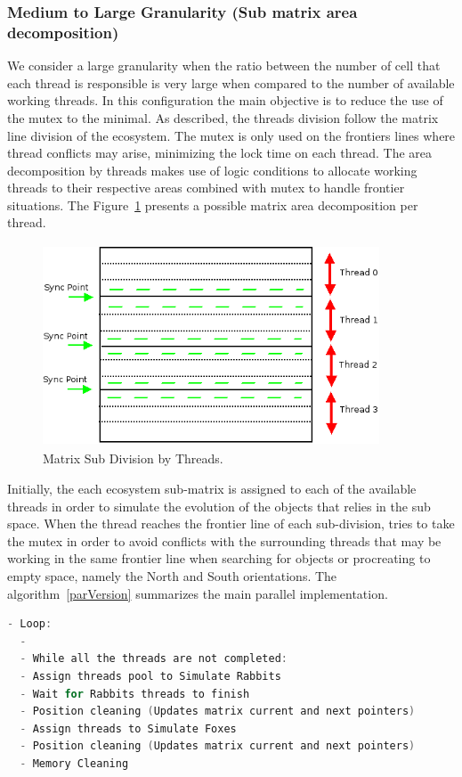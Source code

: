 \documentclass[10pt,a4paper,final]{report}
\begin{document}
\subsubsection{Medium to Large Granularity (Sub matrix area decomposition)}
We consider a large granularity when the ratio between the number of cell that each thread is responsible is very large when compared to the number of available working threads.
In this configuration the main objective is to reduce the use of the mutex to the minimal. As described, the threads division follow the matrix line division of the ecosystem. The mutex is only used on the frontiers lines where thread conflicts may arise, minimizing the lock time on each thread. The area decomposition by threads makes use of logic conditions to allocate working threads to their respective areas combined with mutex to handle frontier situations. The Figure~\ref{fig_submatrix} presents a possible matrix area decomposition per thread. 

\begin{figure}[H]
      \centering
      \includegraphics[height=6cm,width=10cm]{matrixDiv.png}
	        
      \caption{Matrix Sub Division by Threads.}
      \label{fig_submatrix}
\end{figure}

Initially, the each ecosystem sub-matrix is assigned to each of the available threads in order to simulate the evolution of the objects that relies in the sub space. When the thread reaches the frontier line of each sub-division, tries to take the mutex in order to avoid conflicts with the surrounding threads that may be working in the same frontier line when searching for objects or procreating to empty space, namely the North and South orientations. The algorithm~\ref{parVersion} summarizes the main parallel implementation.

\begin{lstlisting}[language=c,basicstyle=\footnotesize,frame=single,caption={Parallel Version.},label=parVersion]
- Loop:
  - 
  - While all the threads are not completed:
  - Assign threads pool to Simulate Rabbits
  - Wait for Rabbits threads to finish
  - Position cleaning (Updates matrix current and next pointers)
  - Assign threads to Simulate Foxes
  - Position cleaning (Updates matrix current and next pointers)
  - Memory Cleaning
\end{lstlisting}
\end{document}
